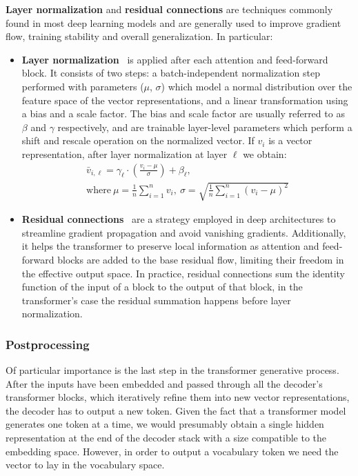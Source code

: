 \textbf{Layer normalization} and \textbf{residual connections} are techniques commonly found in most deep learning models and are generally used to improve gradient flow, training stability and overall generalization.
In particular:
\begin{itemize}
    \item \textbf{Layer normalization}~\cite{ba2016} is applied after each attention and feed-forward block.
It consists of two steps: a batch-independent normalization step performed with parameters ($\mu$, $\sigma$) which model a normal distribution over the feature space of the vector representations, and a linear transformation using a bias and a scale factor.
The bias and scale factor are usually referred to as $\beta$ and $\gamma$ respectively, and are trainable layer-level parameters which perform a shift and rescale operation on the normalized vector.
If $v_i$ is a vector representation, after layer normalization at layer $\ell$ we obtain:
\begin{subequations}
    \begin{gather}
        \bar v_{i,\ell} = \gamma_\ell \cdot \left( \frac{v_i - \mu}{\sigma} \right) + \beta_\ell, \label{eq:background_layernorm} \\
        \text{where}\ \mu = \frac{1}{n}\sum_{i=1}^{n}{v_i},\ \sigma = \sqrt{\frac{1}{n}\sum_{i=1}^{n}{{(v_i - \mu)}^2}} \label{eq:background_layernorm_extra}
    \end{gather}
\end{subequations}
    \item \textbf{Residual connections}~\cite{he2016} are a strategy employed in deep architectures to streamline gradient propagation and avoid vanishing gradients.
Additionally, it helps the transformer to preserve local information as attention and feed-forward blocks are added to the base residual flow, limiting their freedom in the effective output space.
In practice, residual connections sum the identity function of the input of a block to the output of that block, in the transformer's case the residual summation happens before layer normalization.
\end{itemize}

\subsubsection*{Postprocessing}

Of particular importance is the last step in the transformer generative process.
After the inputs have been embedded and passed through all the decoder's transformer blocks, which iteratively refine them into new vector representations, the decoder has to output a new token.
Given the fact that a transformer model generates one token at a time, we would presumably obtain a single hidden representation at the end of the decoder stack with a size compatible to the embedding space.
However, in order to output a vocabulary token we need the vector to lay in the vocabulary space.

